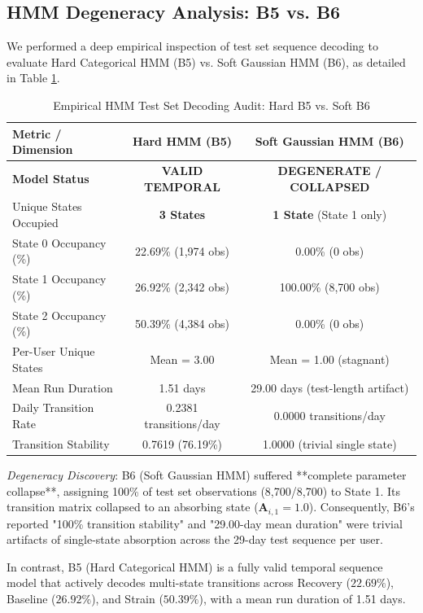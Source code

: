 \documentclass[conference]{IEEEtran}
\begin{document}
\subsection{HMM Degeneracy Analysis: B5 vs. B6}
We performed a deep empirical inspection of test set sequence decoding to evaluate Hard Categorical HMM (B5) vs. Soft Gaussian HMM (B6), as detailed in Table \ref{tab_hmm_audit}.

\begin{table}[htbp]
\caption{Empirical HMM Test Set Decoding Audit: Hard B5 vs. Soft B6}
\begin{center}
\begin{tabular}{l c c}
\toprule
\textbf{Metric / Dimension} & \textbf{Hard HMM (B5)} & \textbf{Soft Gaussian HMM (B6)} \\
\midrule
\textbf{Model Status} & \textbf{VALID TEMPORAL} & \textbf{DEGENERATE / COLLAPSED} \\
Unique States Occupied & \textbf{3 States} & \textbf{1 State} (State 1 only) \\
State 0 Occupancy (\%) & 22.69\% (1,974 obs) & 0.00\% (0 obs) \\
State 1 Occupancy (\%) & 26.92\% (2,342 obs) & 100.00\% (8,700 obs) \\
State 2 Occupancy (\%) & 50.39\% (4,384 obs) & 0.00\% (0 obs) \\
Per-User Unique States & Mean = 3.00 & Mean = 1.00 (stagnant) \\
Mean Run Duration & 1.51 days & 29.00 days (test-length artifact) \\
Daily Transition Rate & 0.2381 transitions/day & 0.0000 transitions/day \\
Transition Stability & 0.7619 (76.19\%) & 1.0000 (trivial single state) \\
\bottomrule
\end{tabular}
\label{tab_hmm_audit}
\end{center}
\end{table}

\textit{Degeneracy Discovery}: B6 (Soft Gaussian HMM) suffered **complete parameter collapse**, assigning 100\% of test set observations (8,700/8,700) to State 1. Its transition matrix collapsed to an absorbing state ($\mathbf{A}_{i,1} = 1.0$). Consequently, B6's reported "100\% transition stability" and "29.00-day mean duration" were trivial artifacts of single-state absorption across the 29-day test sequence per user. 

In contrast, B5 (Hard Categorical HMM) is a fully valid temporal sequence model that actively decodes multi-state transitions across Recovery ($22.69\%$), Baseline ($26.92\%$), and Strain ($50.39\%$), with a mean run duration of 1.51 days.
\end{document}
